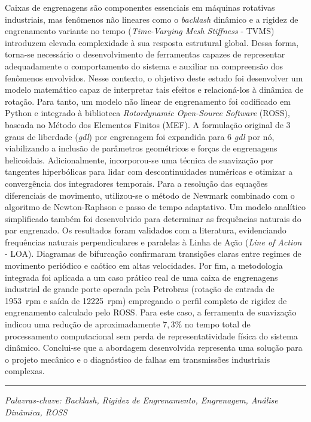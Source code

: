 Caixas de engrenagens são componentes essenciais em máquinas rotativas industriais, mas fenômenos não lineares como o \textit{backlash} dinâmico e a rigidez de engrenamento variante no tempo (\textit{Time-Varying Mesh Stiffness} - TVMS) introduzem elevada complexidade à sua resposta estrutural global. Dessa forma, torna-se necessário o desenvolvimento de ferramentas capazes de representar adequadamente o comportamento do sistema e auxiliar na compreensão dos fenômenos envolvidos. Nesse contexto, o objetivo deste estudo foi desenvolver um modelo matemático capaz de interpretar tais efeitos e relacioná-los à dinâmica de rotação. Para tanto, um modelo não linear de engrenamento foi codificado em Python e integrado à biblioteca \textit{Rotordynamic Open-Source Software} (ROSS), baseada no Método dos Elementos Finitos (MEF). A formulação original de 3 graus de liberdade (\textit{gdl}) por engrenagem foi expandida para 6 \textit{gdl} por nó, viabilizando a inclusão de parâmetros geométricos e forças de engrenagens helicoidais. Adicionalmente, incorporou-se uma técnica de suavização por tangentes hiperbólicas para lidar com descontinuidades numéricas e otimizar a convergência dos integradores temporais. Para a resolução das equações diferenciais de movimento, utilizou-se o método de Newmark combinado com o algoritmo de Newton-Raphson e passo de tempo adaptativo. Um modelo analítico simplificado também foi desenvolvido para determinar as frequências naturais do par engrenado. Os resultados foram validados com a literatura, evidenciando frequências naturais perpendiculares e paralelas à Linha de Ação (\textit{Line of Action} - LOA). Diagramas de bifurcação confirmaram transições claras entre regimes de movimento periódico e caótico em altas velocidades. Por fim, a metodologia integrada foi aplicada a um caso prático real de uma caixa de engrenagens industrial de grande porte operada pela Petrobras (rotação de entrada de 1953~rpm e saída de 12225~rpm) empregando o perfil completo de rigidez de engrenamento calculado pelo ROSS. Para este caso, a ferramenta de suavização indicou uma redução de aproximadamente $7{,}3\%$ no tempo total de processamento computacional sem perda de representatividade física do sistema dinâmico. Conclui-se que a abordagem desenvolvida representa uma solução para o projeto mecânico e o diagnóstico de falhas em transmissões industriais complexas.

\vspace*{\fill}
\noindent\rule{\textwidth}{1pt}
\textit{Palavras-chave: \textit{Backlash}, Rigidez de Engrenamento, Engrenagem, Análise Dinâmica, ROSS}
